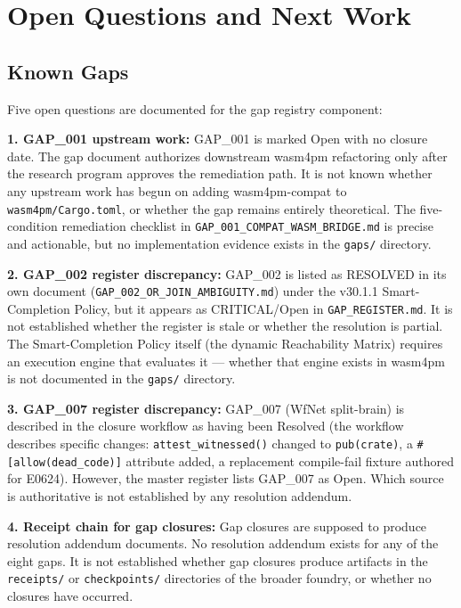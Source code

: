 
\section{Open Questions and Next Work}
\label{sec:gaps-open-questions}

\subsection{Known Gaps}
\label{sec:gaps-open-questions-known}

Five open questions are documented for the gap registry component:

\textbf{1. GAP\_001 upstream work:} GAP\_001 is marked Open with no closure date.
The gap document authorizes downstream wasm4pm refactoring only after the research
program approves the remediation path. It is not known whether any upstream work has
begun on adding wasm4pm-compat to \texttt{wasm4pm/Cargo.toml}, or whether the gap
remains entirely theoretical. The five-condition remediation checklist in
\texttt{GAP\_001\_COMPAT\_WASM\_BRIDGE.md} is precise and actionable, but no
implementation evidence exists in the \texttt{gaps/} directory.

\textbf{2. GAP\_002 register discrepancy:} GAP\_002 is listed as RESOLVED in its
own document (\texttt{GAP\_002\_OR\_JOIN\_AMBIGUITY.md}) under the v30.1.1
Smart-Completion Policy, but it appears as CRITICAL/Open in \texttt{GAP\_REGISTER.md}.
It is not established whether the register is stale or whether the resolution is partial.
The Smart-Completion Policy itself (the dynamic Reachability Matrix) requires an
execution engine that evaluates it — whether that engine exists in wasm4pm is not
documented in the \texttt{gaps/} directory.

\textbf{3. GAP\_007 register discrepancy:} GAP\_007 (WfNet split-brain) is described
in the closure workflow as having been Resolved (the workflow describes specific changes:
\texttt{attest\_witnessed()} changed to \texttt{pub(crate)}, a \texttt{\#[allow(dead\_code)]}
attribute added, a replacement compile-fail fixture authored for E0624). However, the
master register lists GAP\_007 as Open. Which source is authoritative is not established
by any resolution addendum.

\textbf{4. Receipt chain for gap closures:} Gap closures are supposed to produce
resolution addendum documents. No resolution addendum exists for any of the eight gaps.
It is not established whether gap closures produce artifacts in the \texttt{receipts/}
or \texttt{checkpoints/} directories of the broader foundry, or whether no closures
have occurred.

